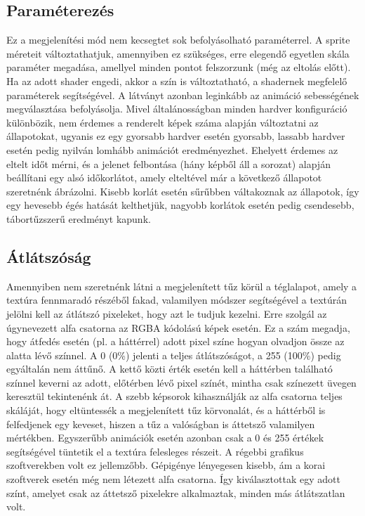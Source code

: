 \subsection{Paraméterezés}
Ez a megjelenítési mód nem kecsegtet sok befolyásolható paraméterrel. A sprite méreteit változtathatjuk, amennyiben ez szükséges, erre elegendő egyetlen skála paraméter megadása, amellyel minden pontot felszorzunk (még az eltolás előtt). Ha az adott shader engedi, akkor a szín is változtatható, a shadernek megfelelő paraméterek segítségével. A látványt azonban leginkább az animáció sebességének megválasztása befolyásolja. Mivel általánosságban minden hardver konfiguráció különbözik, nem érdemes a renderelt képek száma alapján változtatni az állapotokat, ugyanis ez egy gyorsabb hardver esetén gyorsabb, lassabb hardver esetén pedig nyilván lomhább animációt eredményezhet. Ehelyett érdemes az eltelt időt mérni, és a jelenet felbontása (hány képből áll a sorozat) alapján beállítani egy alsó időkorlátot, amely elteltével már a következő állapotot szeretnénk ábrázolni. Kisebb korlát esetén sűrűbben váltakoznak az állapotok, így egy hevesebb égés hatását kelthetjük, nagyobb korlátok esetén pedig csendesebb, tábortűzszerű eredményt kapunk.

\subsection{Átlátszóság}
Amennyiben nem szeretnénk látni a megjelenített tűz körül a téglalapot, amely a textúra fennmaradó részéből fakad, valamilyen módszer segítségével a textúrán jelölni kell az átlátszó pixeleket, hogy azt le tudjuk kezelni. Erre szolgál az úgynevezett alfa csatorna az RGBA kódolású képek esetén. Ez a szám megadja, hogy átfedés esetén (pl. a háttérrel) adott pixel színe hogyan olvadjon össze az alatta lévő színnel.  A 0 (0\%) jelenti a teljes átlátszóságot, a 255 (100\%) pedig egyáltalán nem áttűnő. A kettő közti érték esetén kell a háttérben található színnel keverni az adott, előtérben lévő pixel színét, mintha csak színezett üvegen keresztül tekintenénk át. A szebb képsorok kihasználják az alfa csatorna teljes skáláját, hogy eltüntessék a megjelenített tűz körvonalát, és a háttérből is felfedjenek egy keveset, hiszen a tűz a valóságban is áttetsző valamilyen mértékben. Egyszerűbb animációk esetén azonban csak a 0 és 255 értékek segítségével tüntetik el a textúra felesleges részeit. A régebbi grafikus szoftverekben volt ez jellemzőbb. Gépigénye lényegesen kisebb, ám a korai szoftverek esetén még nem létezett alfa csatorna. Így kiválasztottak egy adott színt, amelyet csak az áttetsző pixelekre alkalmaztak, minden más átlátszatlan volt.

